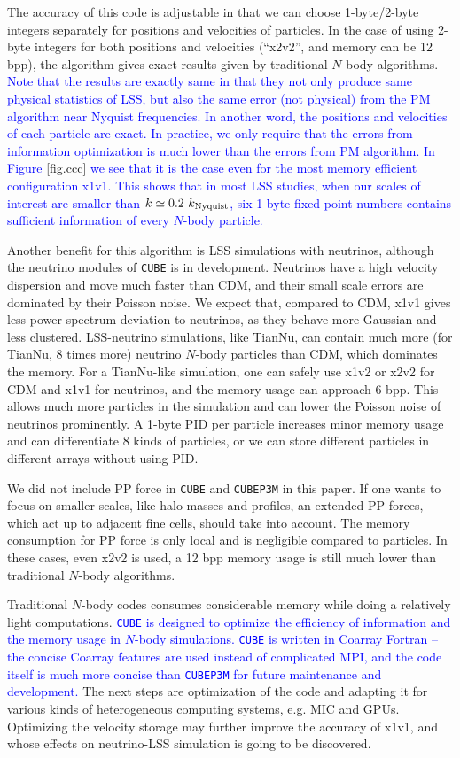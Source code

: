 \documentclass[10pt,twocolumn,preprint]{emulateapj}
\newcommand{\tcb}{\textcolor{blue}}
\begin{document}
The accuracy of this code is adjustable in that we can choose 1-byte/2-byte integers separately for positions and velocities of particles. In the case of using 2-byte integers for both positions and velocities (``x2v2'', and memory can be 12 bpp), the algorithm gives exact results given by traditional $N$-body algorithms. \tcb{Note that the results are exactly same in that they not only produce same physical statistics of LSS, but also the same error (not physical) from the PM algorithm near Nyquist frequencies. In another word, the positions and velocities of each particle are exact. In practice, we only require that the errors from information optimization is much lower than the errors from PM algorithm. In Figure \ref{fig.ccc} we see that it is the case even for the most memory efficient configuration x1v1. This shows that in most LSS studies, when our scales of interest are smaller than $k\simeq 0.2\ k_{\rm Nyquist}$, six 1-byte fixed point numbers contains sufficient information of every $N$-body particle.}

Another benefit for this algorithm is LSS simulations with neutrinos, although the neutrino modules of {\tt CUBE} is in development. Neutrinos have a high velocity dispersion and move much faster than CDM, and their small scale errors are dominated by their Poisson noise. We expect that, compared to CDM, x1v1 gives less power spectrum deviation to neutrinos, as they behave more Gaussian and less clustered. LSS-neutrino simulations, like TianNu, can contain much more (for TianNu, 8 times more) neutrino $N$-body particles than CDM, which dominates the memory. For a TianNu-like simulation, one can safely use x1v2 or x2v2 for CDM and x1v1 for neutrinos, and the memory usage can approach 6 bpp. This allows much more particles in the simulation and can lower the Poisson noise of neutrinos prominently. A 1-byte PID per particle increases minor memory usage and can differentiate 8 kinds of particles, or we can store different particles in different arrays without using PID.

We did not include PP force in {\tt CUBE} and {\tt CUBEP3M} in this paper. If one wants to focus on smaller scales, like halo masses and profiles, an extended PP forces, which act up to adjacent fine cells, should take into account. The memory consumption for PP force is only local and is negligible compared to particles. In these cases, even x2v2 is used, a 12 bpp memory usage is still much lower than traditional $N$-body algorithms.

Traditional $N$-body codes consumes considerable memory while doing a relatively light computations. \tcb{{\tt CUBE} is designed to optimize the efficiency of information and the memory usage in $N$-body simulations. {\tt CUBE} is written in Coarray Fortran -- the concise Coarray features are used instead of complicated MPI, and the code itself is much more concise than {\tt CUBEP3M} for future maintenance and development.} The next steps are optimization of the code and adapting it for various kinds of heterogeneous computing systems, e.g. MIC and GPUs. Optimizing the velocity storage may further improve the accuracy of x1v1, and whose effects on neutrino-LSS simulation is going to be discovered.
\end{document}
